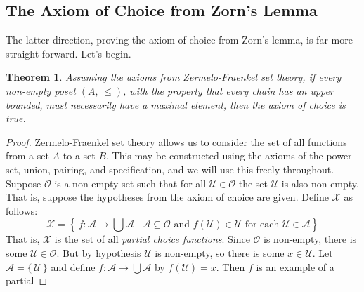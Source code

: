 \documentclass{article}
\newtheorem{theorem}{Theorem}[section]
\theoremstyle{definition}
\begin{document}
        \subsection{The Axiom of Choice from Zorn's Lemma}
            The latter direction, proving the axiom of choice from Zorn's lemma,
            is far more straight-forward. Let's begin.
            \begin{theorem}
                Assuming the axioms from Zermelo-Fraenkel set theory, if
                every non-empty poset $(A,\,\leq)$, with the property that
                every chain has an upper bounded, must necessarily have a
                maximal element, then the axiom of choice is true.
            \end{theorem}
            \begin{proof}
                Zermelo-Fraenkel set theory allows us to consider the set of
                all functions from a set $A$ to a set $B$.  This may be
                constructed using the axioms of the power set, union, pairing,
                and specification, and we will use this freely throughout.
                Suppose $\mathcal{O}$ is a non-empty
                set such that for all $\mathcal{U}\in\mathcal{O}$ the set
                $\mathcal{U}$ is also non-empty. That is, suppose the hypotheses
                from the axiom of choice are given. Define $\mathcal{X}$ as
                follows:
                \begin{equation}
                    \mathcal{X}
                    =\left\{\,
                        f:\mathcal{A}
                            \rightarrow\bigcup\mathcal{A}
                        \;\big|\;
                        \mathcal{A}
                        \subseteq\mathcal{O}
                        \textrm{ and }
                        f(\mathcal{U})\in\mathcal{U}
                        \textrm{ for each }
                        \mathcal{U}\in\mathcal{A}
                    \right\}
                \end{equation}
                That is, $\mathcal{X}$ is the set of all
                \textit{partial choice functions}. Since $\mathcal{O}$ is
                non-empty, there is some $\mathcal{U}\in\mathcal{O}$.
                But by hypothesis $\mathcal{U}$ is non-empty, so there is some
                $x\in\mathcal{U}$. Let
                $\mathcal{A}=\{\,\mathcal{U}\,\}$ and define
                $f:\mathcal{A}\rightarrow\bigcup\mathcal{A}$
                by $f(\mathcal{U})=x$. Then $f$ is an example of a partial

\end{proof}
\end{document}

